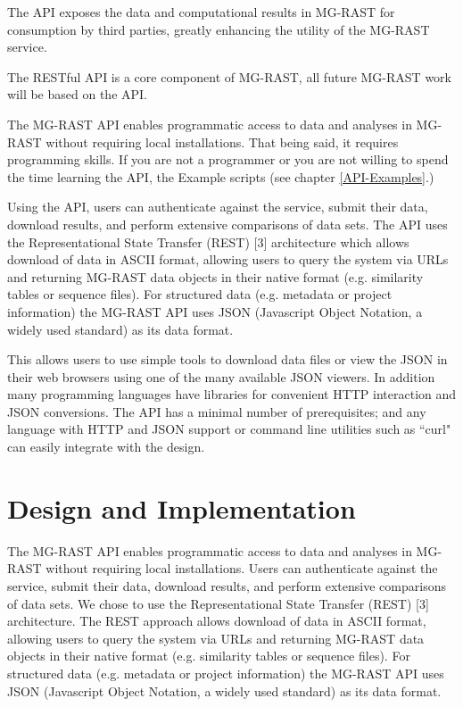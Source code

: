 The API exposes the data and computational results in MG-RAST for consumption by third parties, greatly enhancing the utility of the MG-RAST service.

The RESTful API is a core component of MG-RAST, all future MG-RAST work will be based on the API.


The MG-RAST API enables programmatic access to data and analyses in MG-RAST without requiring local installations. That being said, it requires programming skills. If you are not a programmer or you are not willing to spend the time learning the API, the Example scripts (see chapter \ref{API-Examples}.) 

Using the API, users can authenticate against the service, submit their data, download results, and perform extensive comparisons of data sets. The API uses the Representational State Transfer (REST) [3] architecture which allows download of data in ASCII format, allowing users to query the system via URLs and returning MG-RAST data objects in their native format (e.g. similarity tables or sequence files). For structured data (e.g. metadata or project information) the MG-RAST API uses JSON (Javascript Object Notation, a widely used standard) as its data format. 

This allows users to use simple tools to download data files or view the JSON in their web browsers using one of the many available JSON viewers. In addition many programming languages have libraries for convenient HTTP interaction and JSON conversions. The API has a minimal number of prerequisites; and any language with HTTP and JSON support or command line utilities such as ``curl" can easily integrate with the design. 
\section{Design and Implementation}
The MG-RAST API enables programmatic access to data and analyses in MG-RAST without requiring local installations. Users can authenticate against the service, submit their data, download results, and perform extensive comparisons of data sets. We chose to use the Representational State Transfer (REST) [3] architecture. The REST approach allows download of data in ASCII format, allowing users to query the system via URLs and returning  MG-RAST data objects in their native format (e.g. similarity tables or sequence files). For structured data (e.g. metadata or project information) the MG-RAST API uses JSON (Javascript Object Notation, a widely used standard) as its data format. 

